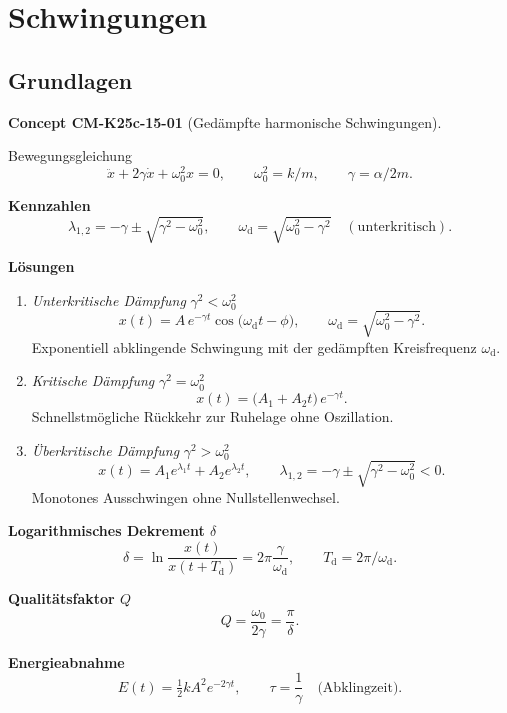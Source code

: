 \documentclass[10pt, letterpaper]{article}
\newcommand{\CustomHeading}[3]{%
  \par\medskip\noindent%
  \textbf{#1 #2} \textnormal{(#3)}.\enskip%
}
\newenvironment{CONC}[2]{\CustomHeading{Concept}{#1}{#2}}{}
\begin{document}
\section{Schwingungen}

\subsection{Grundlagen}

\begin{CONC}{CM-K25c-15-01}{Gedämpfte harmonische Schwingungen}
Bewegungsgleichung  
\[
\ddot x + 2\gamma\dot x + \omega_{0}^{2}x = 0,
\qquad
\omega_{0}^{2}=k/m,
\qquad
\gamma=\alpha/2m .
\]

\textbf{Kennzahlen}  
\[
\lambda_{1,2}=-\gamma\pm\sqrt{\gamma^{2}-\omega_{0}^{2}},
\qquad
\omega_{\text{d}}=\sqrt{\omega_{0}^{2}-\gamma^{2}}\quad
(\text{unterkritisch}) .
\]

\textbf{Lösungen}

\begin{enumerate}
  \item \emph{Unterkritische Dämpfung} \(\gamma^{2}<\omega_{0}^{2}\)  
        \[
          x(t)=A\,e^{-\gamma t}\cos\!\bigl(\omega_{\mathrm d}t-\phi\bigr),
          \qquad
          \omega_{\mathrm d}=\sqrt{\omega_{0}^{2}-\gamma^{2}} .
        \]
        Exponentiell abklingende Schwingung mit der gedämpften Kreisfrequenz
        \(\omega_{\mathrm d}\).

  \item \emph{Kritische Dämpfung} \(\gamma^{2}=\omega_{0}^{2}\)  
        \[
          x(t)=\bigl(A_{1}+A_{2}t\bigr)\,e^{-\gamma t}.
        \]
        Schnellstmögliche Rückkehr zur Ruhelage ohne Oszillation.

  \item \emph{Überkritische Dämpfung} \(\gamma^{2}>\omega_{0}^{2}\)  
        \[
          x(t)=A_{1}e^{\lambda_{1}t}+A_{2}e^{\lambda_{2}t},
          \qquad
          \lambda_{1,2}=-\gamma\pm\sqrt{\gamma^{2}-\omega_{0}^{2}}<0 .
        \]
        Monotones Ausschwingen ohne Nullstellenwechsel.
\end{enumerate}


\textbf{Logarithmisches Dekrement \(\delta\)}  
\[
\delta=\ln\frac{x(t)}{x(t+T_{\text{d}})}
      =2\pi\frac{\gamma}{\omega_{\text{d}}},
\qquad
T_{\text{d}}=2\pi/\omega_{\text{d}} .
\]

\textbf{Qualitätsfaktor \(Q\)}  
\[
Q=\frac{\omega_{0}}{2\gamma}
  =\frac{\pi}{\delta}.
\]

\textbf{Energieabnahme}  
\[
E(t)=\tfrac12kA^{2}e^{-2\gamma t},
\qquad
\tau=\frac{1}{\gamma}\quad\text{(Abklingzeit)}.
\]
\end{CONC}
\end{document}
